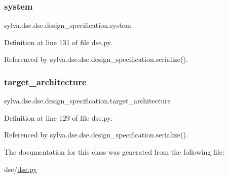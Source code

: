 \subsubsection{\texorpdfstring{system}{system}}
{\footnotesize\ttfamily sylva.\+dse.\+dse.\+design\+\_\+specification.\+system}



Definition at line 131 of file dse.\+py.



Referenced by sylva.\+dse.\+dse.\+design\+\_\+specification.\+serialize().

\mbox{\label{classsylva_1_1dse_1_1dse_1_1design__specification_abbf25f6a1f9aaa73f5e29885b8bdd8a6}} 
\subsubsection{\texorpdfstring{target\+\_\+architecture}{target\_architecture}}
{\footnotesize\ttfamily sylva.\+dse.\+dse.\+design\+\_\+specification.\+target\+\_\+architecture}



Definition at line 129 of file dse.\+py.



Referenced by sylva.\+dse.\+dse.\+design\+\_\+specification.\+serialize().



The documentation for this class was generated from the following file\+:\begin{DoxyCompactItemize}
\item 
dse/\hyperlink{dse_8py}{dse.\+py}\end{DoxyCompactItemize}
